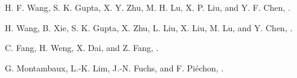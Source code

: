 \documentclass[%
reprint,
amsmath,amssymb,amsfonts
aps,
superscriptaddress,
prx
]{revtex4-1}
\begin{document}
\begin{thebibliography}{99}
 H. F. Wang, S. K. Gupta, X. Y. Zhu, M. H. Lu, X. P. Liu, and Y. F. Chen, 
\href{https://doi.org/10.1088/1674-1056/25/11/117106}{}.

 H. Wang, B. Xie, S. K. Gupta, X. Zhu, L. Liu, X. Liu, M. Lu, and Y. Chen, 
\href{https://doi.org/10.1103/PhysRevB.100.165134}{}.

%

 C. Fang, H. Weng, X. Dai, and Z. Fang,  
\href{https://doi.org/10.1088/1674-1056/25/11/117106}{}.

 G. Montambaux, L.-K. Lim, J.-N. Fuchs, and F. Piéchon, 
\href{https://doi.org/10.1103/PhysRevLett.121.256402}{}.


\end{thebibliography}
 
\end{document}
